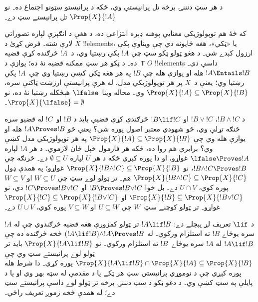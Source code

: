 \documentclass[../../../include/open-logic-section]{subfiles}
\begin{document}
د هر سټ دنننۍ برخه تل پرانيستې وي، ځکه د پرانيستو سټونو اجتماع ده۔
نو $\Prop{X}{!A}$ تل پرانيستے سټ دے۔

که څۀ هم توپولوژيکي معنايي پوهنه ډېره انتزاعي ده، د هغې د انګېزې
لپاره تصوراتي لارې شته۔ فرض کړئ د $X$ !!{element}s، يا «ټکي»،
هغه ځايونه دي چې ويناوې پکې ارزول کېدے شي۔ د هغو ټولو ټکو سټ
چې $!A$ پکې رښتيا وي، د~$!A$ څرګنده کړې قضيه ده۔ د ټکو هر سټ
ممکنه قضيه نۀ ده؛ يوازې د $\Top{O}$ !!{element}s داسې دي۔
$!A \Entails !B$ هله او يوازې هله چې $!B$ په هر هغه ټکي کښې
رښتيا وي چې~$!A$ پکې رښتيا وي؛ يعنې د~$X$ پر هر توپولوژيکي مدل، له هرې پرانيستې ارزښت ټاکنې سره،
$\Prop{X}{!A} \subseteq \Prop{X}{!B}$ وي۔ محاله وينا~$\lfalse$
هېڅکله رښتيا نۀ ده، نو $\Prop{X}{\lfalse} = \emptyset$۔

د $!B \land !C$، $!B \lor !C$ او $!B \lif !C$ څرګندې کړې
قضيې بايد د $!B$ او~$!C$ له قضيو سره څنګه تړلې وي، څو شهودي
معتبر اصول پوره شي؟ يعنې څو $!A \Proves !B$ هله او يوازې هله
وي چې $\Prop{X}{!A} \subseteq \Prop{X}{!B}$ په هر توپولوژيکي
مدل کښې وي؟ برابري هم روا ده، ځکه هر فارمول خپل ځان لازموي۔ د هر $!A$
لپاره $\lfalse \Proves !A$ غواړو، او دا پوره کېږي ځکه د هر
$U$ لپاره $\emptyset \subseteq U$ دے۔ څرنګه چې
$!B \land !C \Proves !B$، نو
$\Prop{X}{!B \land !C} \subseteq \Prop{X}{!B}$ غواړو؛ په
همدې ډول $\Prop{X}{!B \land !C} \subseteq \Prop{X}{!C}$ هم۔
تر ټولو لوے سټ چې $W \subseteq U$ او $W \subseteq V$ پوره کوي،
$U \cap V$ دے۔ بل خوا $!B \Proves !B \lor !C$ او
$!C \Proves !B \lor !C$ دي، نو
$\Prop{X}{!B} \subseteq \Prop{X}{!B \lor !C}$ او
$\Prop{X}{!C} \subseteq \Prop{X}{!B \lor !C}$ غواړو۔ تر ټولو
کوچنے سټ~$W$ چې $U \subseteq W$ او $V \subseteq W$ پوره کوي،
$U \cup V$ دے۔

د $\lif$ تعريف لږ پېچلے دے: $!A \lif !B$ تر ټولو کمزورې هغه
قضيه څرګندوي چې له $!A$ سره يوځاے $!B$ ته استلزام ورکوي۔
له $(!A \lif !B) \land !A \Proves !B $ څخه څرګنده ده چې $!A
\lif !B$ له $!A$ سره يوځاے~$!B$ ته استلزام ورکوي۔ نو
$\Prop{X}{!A \lif !B}$ بايد تر ټولو لوے پرانيستے سټ وي چې
$\Prop{X}{!A \lif !B} \cap \Prop{X}{!A} \subseteq \Prop{X}{!B}$ پوره کړي۔ دا شرط هله پوره کېږي چې
د نوموړي پرانيستي سټ هر ټکے يا د مقدمې له سټه بهر وي او يا د
پايلې په سټ کښې وي۔ د دغو ټکو د سټ دنننۍ برخه تر ټولو لوے داسې
پرانيستے سټ دے؛ له همدې څخه زموږ تعريف راځي۔
\end{document}
